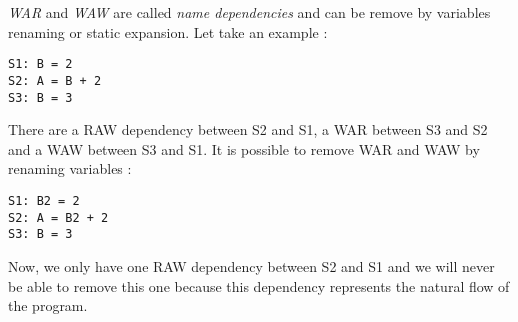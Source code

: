 \emph{WAR} and \emph{WAW} are called \emph{name dependencies} and can be remove by variables renaming or static expansion. Let take an example :
\begin{lstlisting}
S1: B = 2
S2: A = B + 2
S3: B = 3
\end{lstlisting}

There are a RAW dependency between S2 and S1, a WAR between S3 and S2 and a WAW between S3 and S1. It is possible to remove WAR and WAW by renaming variables :
\begin{lstlisting}
S1: B2 = 2
S2: A = B2 + 2
S3: B = 3
\end{lstlisting}
Now, we only have one RAW dependency between S2 and S1 and we will never be able to remove this one because this dependency represents the natural flow of the program.
